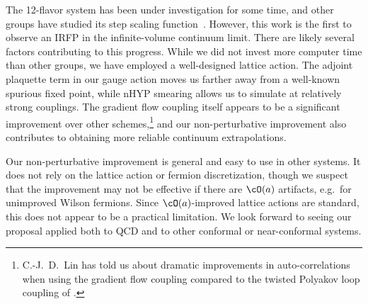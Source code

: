 The 12-flavor system has been under investigation for some time, and other groups have studied its step scaling function~\cite{Lin:2012iw, Appelquist:2007hu, Appelquist:2009ty, Itou:2012qn}.
However, this work is the first to observe an IRFP in the infinite-volume continuum limit.
There are likely several factors contributing to this progress.
While we did not invest more computer time than other groups, we have employed a well-designed lattice action.
The adjoint plaquette term in our gauge action moves us farther away from a well-known spurious fixed point, while nHYP smearing allows us to simulate at relatively strong couplings.
The gradient flow coupling itself appears to be a significant improvement over other schemes,\footnote{C.-J.~D.~Lin has told us about dramatic improvements in auto-correlations when using the gradient flow coupling compared to the twisted Polyakov loop coupling of .} and our non-perturbative improvement also contributes to obtaining more reliable continuum extrapolations.

Our non-perturbative improvement is general and easy to use in other systems.
It does not rely on the lattice action or fermion discretization, though we suspect that the improvement may not be effective if there are $\cO(a)$ artifacts, e.g.\ for unimproved Wilson fermions.
Since $\cO(a)$-improved lattice actions are standard, this does not appear to be a practical limitation.
We look forward to seeing our proposal applied both to QCD and to other conformal or near-conformal systems.
